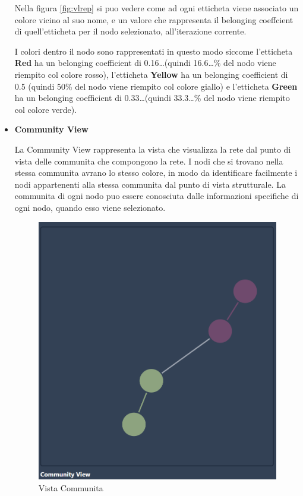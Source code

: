 \documentclass[a4paper,12pt]{report}
\begin{document}
\begin{itemize}
			Nella figura \ref{fig:vlrep} si puo vedere come ad ogni etticheta viene associato un colore vicino al suo nome, e un valore che rappresenta il belonging coeffcient di quell'etticheta per il nodo selezionato, all'iterazione corrente. 

			I colori dentro il nodo sono rappresentati in questo modo siccome l'etticheta \textbf{Red} ha un belonging coefficient di 0.16\dots (quindi 16.6\dots\% del nodo viene riempito col colore rosso), l'etticheta \textbf{Yellow} ha un belonging coefficient di 0.5 (quindi 50\% del nodo viene riempito col colore giallo) e l'etticheta \textbf{Green} ha un belonging coefficient di 0.33\dots (quindi 33.3\dots\% del nodo viene riempito col colore verde).

			\item \textbf{Community View} 

			La Community View rappresenta la vista che visualizza la rete dal punto di vista delle communita che compongono la rete. I nodi che si trovano nella stessa communita avrano lo stesso colore, in modo da identificare facilmente i nodi appartenenti alla stessa communita dal punto di vista strutturale. La communita di ogni nodo puo essere conosciuta dalle informazioni specifiche di ogni nodo, quando esso viene selezionato. 

			\begin{center}
			\begin{figure}[H]
			\centering
			\includegraphics[width=0.9\linewidth,keepaspectratio]{comview}
			\caption{Vista Communita}
			\end{figure}
			\end{center}


\end{itemize}
\end{document}

